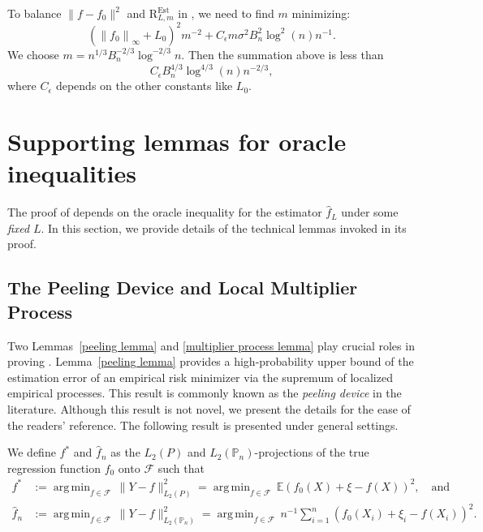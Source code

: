 \documentclass[12pt]{article}
\DeclareMathOperator*{\argmin}{arg\,min}
\begin{document}
\begin{appendices}
To balance $\|f - f_0\|^2$ and $\mathrm{R}_{L,m}^{\text {Est }}$ in , we need to find $m$ minimizing:
\begin{equation*}
(\left\|f_0\right\|_{\infty}+L_0)^2 m^{-2} + C_\epsilon m \sigma^2 B_n^2 \log ^2(n) n^{-1}.
\end{equation*}
We choose $m = n^{1/3} B_n^{-2/3}\log^{-2/3} n$. Then the summation above is less than 
\begin{equation*}
    C_\epsilon B_n^{4/3} \log^{4/3}(n) n^{-2/3},
\end{equation*}
where $C_\epsilon$ depends on the other constants like $L_0$. 


\newpage
\section{Supporting lemmas for oracle inequalities}\label{supp:oracle-lemma}
The proof of  depends on the oracle inequality for the estimator $\widehat f_L$ under some \emph{fixed} $L$. In this section, we provide details of the technical lemmas invoked in its proof.   

\subsection{The Peeling Device and Local Multiplier Process}\label{suppsec:main-lemma}
Two Lemmas~\ref{peeling lemma} and \ref{multiplier process lemma} play crucial roles in proving . Lemma~\ref{peeling lemma} provides a high-probability upper bound of the estimation error of an empirical risk minimizer via the supremum of localized empirical processes. This result is commonly known as the \textit{peeling device} in the literature. Although this result is not novel, we present the details for the ease of the readers' reference. The following result is presented under general settings.

We define $f^*$ and $\widehat f_n$ as the $L_2(P)$ and $L_2(\mathbb{P}_n)$-projections of the true regression function $f_0$ onto $\mathcal{F}$ such that 
\begin{align}
	f^* &:= \argmin_{f\in \mathcal{F}}\, \|Y-f\|^2_{L_2(P)} = \argmin_{f\in \mathcal{F}} \, \mathbb{E}\left(f_0(X)+\xi-f(X)\right)^2,\quad \textrm{and}\nonumber\\
    \widehat f_n &:= \argmin_{f\in \mathcal{F}} \, \|Y-f\|^2_{L_2(\mathbb{P}_n)} = \argmin_{f\in \mathcal{F}} \, n^{-1}\sum_{i = 1}^n\left(f_0(X_i)+\xi_i-f(X_i)\right)^2.\nonumber
\end{align}


\end{appendices}
\end{document}
